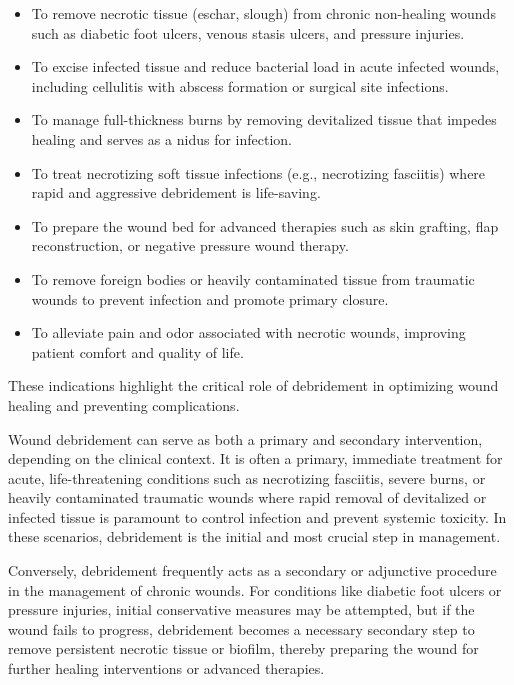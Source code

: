 \begin{itemize}
  \item To remove necrotic tissue (eschar, slough) from chronic non-healing wounds such as diabetic foot ulcers, venous stasis ulcers, and pressure injuries.
  \item To excise infected tissue and reduce bacterial load in acute infected wounds, including cellulitis with abscess formation or surgical site infections.
  \item To manage full-thickness burns by removing devitalized tissue that impedes healing and serves as a nidus for infection.
  \item To treat necrotizing soft tissue infections (e.g., necrotizing fasciitis) where rapid and aggressive debridement is life-saving.
  \item To prepare the wound bed for advanced therapies such as skin grafting, flap reconstruction, or negative pressure wound therapy.
  \item To remove foreign bodies or heavily contaminated tissue from traumatic wounds to prevent infection and promote primary closure.
  \item To alleviate pain and odor associated with necrotic wounds, improving patient comfort and quality of life.
\end{itemize}

These indications highlight the critical role of debridement in optimizing wound healing and preventing complications.

Wound debridement can serve as both a primary and secondary intervention, depending on the clinical context. It is often a primary, immediate treatment for acute, life-threatening conditions such as necrotizing fasciitis, severe burns, or heavily contaminated traumatic wounds where rapid removal of devitalized or infected tissue is paramount to control infection and prevent systemic toxicity. In these scenarios, debridement is the initial and most crucial step in management. 

Conversely, debridement frequently acts as a secondary or adjunctive procedure in the management of chronic wounds. For conditions like diabetic foot ulcers or pressure injuries, initial conservative measures may be attempted, but if the wound fails to progress, debridement becomes a necessary secondary step to remove persistent necrotic tissue or biofilm, thereby preparing the wound for further healing interventions or advanced therapies.

